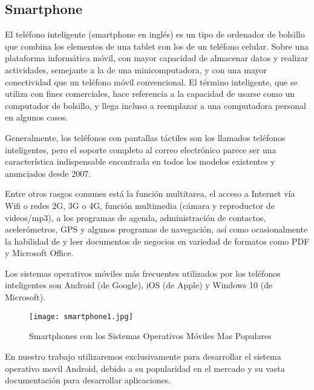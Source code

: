 \subsection{Smartphone}

\par 
El teléfono inteligente (smartphone en inglés) es un tipo de ordenador de bolsillo que combina los elementos de una tablet con los de un teléfono celular. Sobre una plataforma informática móvil, con mayor capacidad de almacenar datos y realizar actividades, semejante a la de una minicomputadora, y con una mayor conectividad que un teléfono móvil convencional. El término inteligente, que se utiliza con fines comerciales, hace referencia a la capacidad de usarse como un computador de bolsillo, y llega incluso a reemplazar a una computadora personal en algunos casos\cite{smartphone}.
	
\par \noindent
Generalmente, los teléfonos con pantallas táctiles son los llamados teléfonos inteligentes, pero el soporte completo al correo electrónico parece ser una característica indispensable encontrada en todos los modelos existentes y anunciados desde 2007\cite{smartphone}.
		
\par \noindent
Entre otros rasgos comunes está la función multitarea, el acceso a Internet vía Wifi o redes 2G, 3G o 4G, función multimedia (cámara y reproductor de videos/mp3), a los programas de agenda, administración de contactos, acelerómetros, GPS y algunos programas de navegación, así como ocasionalmente la habilidad de y leer documentos de negocios en variedad de formatos como PDF y Microsoft Office\cite{smartphone}.

\par \noindent
Los sistemas operativos móviles más frecuentes utilizados por los teléfonos inteligentes son Android (de Google), iOS (de Apple) y Windows 10 (de Microsoft)\cite{smartphone}.

\begin{figure}[H]
	\texttt{[image: smartphone1.jpg]}
	\caption{Smartphones con los Sistemas Operativos Móviles Mas Populares}
\end{figure}

\par \noindent
En nuestro trabajo utilizaremos exclusivamente para desarrollar el sistema operativo movil Android, debido a su popularidad en el mercado y su vasta documentación para desarrollar aplicaciones.